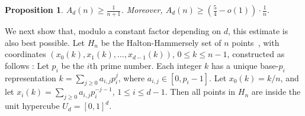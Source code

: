 \documentclass[11pt]{article}
\newtheorem{proposition}{Proposition}
\newcommand{\old}[1]{{}}
\begin{document}
\begin{proposition} \label{P2}
$A_d(n) \geq \frac{1}{n+1}$. Moreover,
$A_d(n) \geq \left(\frac{5}{4}-o(1)\right) \cdot \frac{1}{n}$. 
\end{proposition}


\old{
By projecting the $n$ points on one of the faces of $U_d$,
and proceeding by induction on $d$, it follows that the lower bound in
Theorem \ref{T1} carries over here too. 
That is, $A_d(n) \geq (\frac{5}{4}-o(1)) \cdot \frac{1}{n}$. 
} 

We next show that, modulo a constant factor depending on $d$, this estimate is also best possible. 
Let $H_n$ be the Halton-Hammersely set of $n$
points~\cite{Hal60,Ham60}, with coordinates 
$(x_0(k), x_1(k), \ldots, x_{d-1}(k))$, $0 \le k \le n-1$,
constructed as follows \cite{Ch00,Ma99}:
Let $p_i$ be the $i$th prime number.
Each integer $k$ has a unique base-$p_i$ representation
$k = \sum_{j\ge 0} a_{i,j} p_i^j$, where $a_{i,j} \in [0, p_i-1]$.
Let $x_0(k) = k/n$,
and let $x_i(k) = \sum_{j\ge 0} a_{i,j} p_i^{-j-1}$, $1 \le i \le d-1$.
Then all points in $H_n$ are inside the unit hypercube $U_d=[0,1]^d$.
\end{document}

